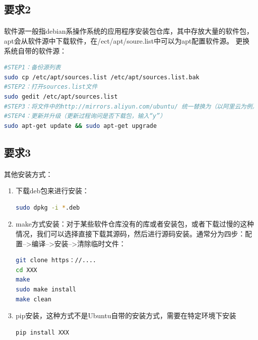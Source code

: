 \documentclass[40pt,a4paper，UTF8]{ctexart}
\begin{document}
\subsection{要求2}
\paragraph{}
软件源一般指debian系操作系统的应用程序安装包仓库，其中存放大量的软件包，apt会从软件源中下载软件，在/ect/apt/soure.list中可以为apt配置软件源。
更换系统自带的软件源：
\begin{lstlisting}[language=bash, caption=更换软件源]
#STEP1：备份源列表
sudo cp /etc/apt/sources.list /etc/apt/sources.list.bak  	
#STEP2：打开sources.list文件
sudo gedit /etc/apt/sources.list  							
#STEP3：将文件中的http://mirrors.aliyun.com/ubuntu/ 统一替换为（以阿里云为例）http://mirrors.aliyun.com/ubuntu/  保存退出
#STEP4：更新并升级（更新过程询问是否下载包，输入“y”）
sudo apt-get update && sudo apt-get upgrade
\end{lstlisting}

\paragraph{}

\subsection{要求3}
\paragraph{}

其他安装方式：
\begin{enumerate}
\item 下载deb包来进行安装：
\begin{lstlisting}[language=bash, caption=使用deb包进行安装]
sudo dpkg -i *.deb
\end{lstlisting}
\item make方式安装：对于某些软件仓库没有的库或者安装包，或者下载过慢的这种情况，我们可以选择直接下载其源码，然后进行源码安装。通常分为四步：配置–>编译–>安装–>清除临时文件：
\begin{lstlisting}[language=bash, caption=使用make进行安装]
git clone https：//....
cd XXX
make
sudo make install
make clean
\end{lstlisting}

\item pip安装，这种方式不是Ubuntu自带的安装方式，需要在特定环境下安装
\begin{lstlisting}[language=bash, caption=使用pip进行安装]
pip install XXX
\end{lstlisting}
\end{enumerate}
\end{document}
